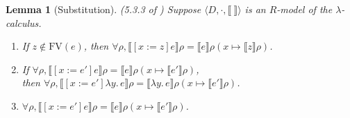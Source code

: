 \documentclass{tufte-handout}
\newcommand{\SEM}[1]{\llbracket #1 \rrbracket}
\newcommand{\LAM}[1]{\lambda #1.\,}
\newcommand{\by}[0]{\!:=\!}
\newcommand{\ext}[3]{#3(#1{\mapsto}#2)}
\newtheorem{lemma}[theorem]{Lemma}
\begin{document}
\begin{lemma}[Substitution] (5.3.3 of \citet{barendregt84:_lambda_calculus} )
\label{lem:subst-model}
  Suppose $\langle D,\cdot, \SEM{\ } \rangle$ is an $R$-model of the
  $\lambda$-calculus. 
  \begin{enumerate}
  \item If $z \notin \mathrm{FV}(e)$, then
      $\forall \rho, \SEM{ [x\by z]e } \rho = \SEM{e}\ext{x}{\SEM{z}\rho}{\rho}$.
  \item If $\forall \rho, \SEM{ [x\by e']e} \rho = \SEM{e}\ext{x}{\SEM{e'}\rho}{\rho}$, \\
    then $\forall \rho, \SEM{ [x\by e']\LAM{y}e} \rho = \SEM{\LAM{y}e}\ext{x}{\SEM{e'}\rho}{\rho}$.
  \item $\forall \rho, \SEM{ [x\by e']e} \rho = \SEM{e}\ext{x}{\SEM{e'}\rho}{\rho}$.
  \end{enumerate}
\end{lemma}
\end{document}
